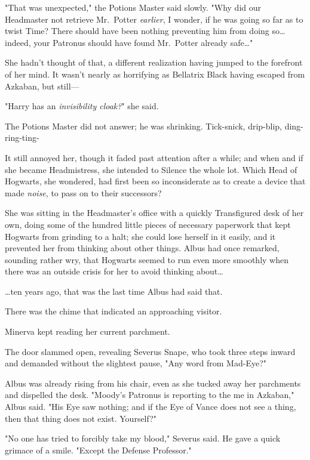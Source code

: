 "That was unexpected," the Potions Master said slowly. "Why did our Headmaster
not retrieve Mr.~Potter \emph{earlier}, I wonder, if he was going so far as to
twist Time? There should have been nothing preventing him from doing so{\ldots}
indeed, your Patronus should have found Mr.~Potter already safe{\ldots}"

She hadn't thought of that, a different realization having jumped to the
forefront of her mind. It wasn't nearly as horrifying as Bellatrix Black having
escaped from Azkaban, but still---

"Harry has an \emph{invisibility cloak?}" she said.

The Potions Master did not answer; he was shrinking.
\later
Tick-snick, drip-blip, ding-ring-ting-

It still annoyed her, though it faded past attention after a while; and when
and if she became Headmistress, she intended to Silence the whole lot. Which
Head of Hogwarts, she wondered, had first been so inconsiderate as to create a
device that made \emph{noise}, to pass on to their successors?

She was sitting in the Headmaster's office with a quickly Transfigured desk of
her own, doing some of the hundred little pieces of necessary paperwork that
kept Hogwarts from grinding to a halt; she could lose herself in it easily, and
it prevented her from thinking about other things. Albus had once remarked,
sounding rather wry, that Hogwarts seemed to run even more smoothly when there
was an outside crisis for her to avoid thinking about{\ldots}

{\ldots}ten years ago, that was the last time Albus had said that.

There was the chime that indicated an approaching visitor.

Minerva kept reading her current parchment.

The door slammed open, revealing Severus Snape, who took three steps inward and
demanded without the slightest pause, "Any word from Mad-Eye?"

Albus was already rising from his chair, even as she tucked away her parchments
and dispelled the desk. "Moody's Patronus is reporting to the me in Azkaban,"
Albus said. "His Eye saw nothing; and if the Eye of Vance does not see a thing,
then that thing does not exist. Yourself?"

"No one has tried to forcibly take my blood," Severus said. He gave a quick
grimace of a smile. "Except the Defense Professor."

